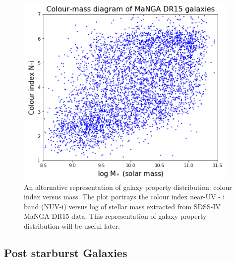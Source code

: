 \begin{figure}
    \centering
    \includegraphics[width=\columnwidth]{images/CMDs/CMD-mass-1.png}
    \caption{An alternative representation of galaxy property distribution: colour index versus mass. The plot portrays the colour index near-UV - i band (NUV-i) versus log of stellar mass extracted from SDSS-IV MaNGA DR15 data. This representation of galaxy property distribution will be useful later.}
    \label{fig:CMD-mass-1}
\end{figure}

\subsection{Post starburst Galaxies}

